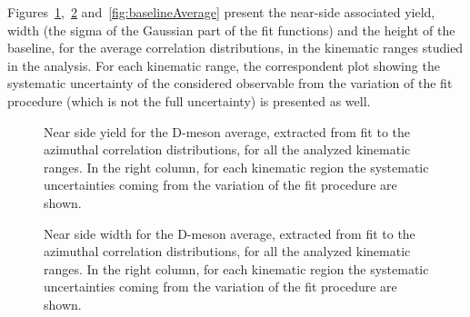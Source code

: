 Figures~\ref{fig:nearsideyieldAverage},~\ref{fig:nearsidesigmaAverage} and~\ref{fig:baselineAverage} present the near-side associated yield, width (the sigma of the Gaussian part of the fit functions) and the height of the baseline, for the average correlation distributions, in the kinematic ranges studied in the analysis. For each kinematic range, the correspondent plot showing the systematic uncertainty of the considered observable from the variation of the fit procedure (which is not the full uncertainty) is presented as well.

\begin{figure}
\centering

\caption{Near side yield for the D-meson average, extracted from fit to the azimuthal correlation distributions, for all the analyzed kinematic ranges. In the right column, for each kinematic region the systematic uncertainties coming from the variation of the fit procedure are shown.}
\label{fig:nearsideyieldAverage}
\end{figure}

\begin{figure}
\centering

\caption{Near side width for the D-meson average, extracted from fit to the azimuthal correlation distributions, for all the analyzed kinematic ranges. In the right column, for each kinematic region the systematic uncertainties coming from the variation of the fit procedure are shown.}
\label{fig:nearsidesigmaAverage}
\end{figure}

